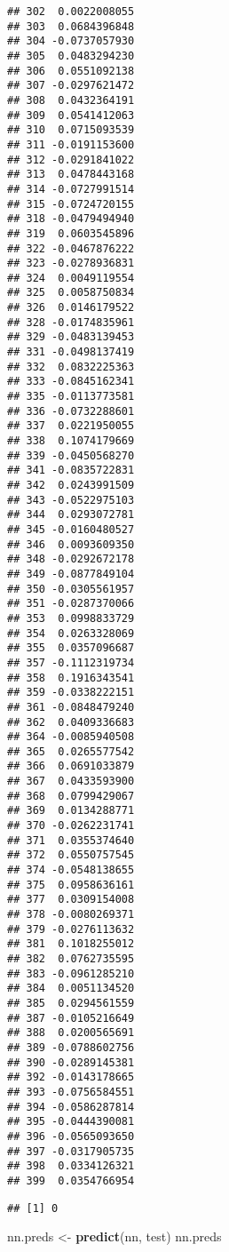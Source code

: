 \documentclass[
]{article}
\newenvironment{Shaded}{\begin{snugshade}}{\end{snugshade}}
\newcommand{\KeywordTok}[1]{\textcolor[rgb]{0.13,0.29,0.53}{\textbf{#1}}}
\newcommand{\NormalTok}[1]{#1}
\newcommand{\OperatorTok}[1]{\textcolor[rgb]{0.81,0.36,0.00}{\textbf{#1}}}
\newcommand{\StringTok}[1]{\textcolor[rgb]{0.31,0.60,0.02}{#1}}
\begin{document}
\begin{verbatim}
## 302  0.0022008055
## 303  0.0684396848
## 304 -0.0737057930
## 305  0.0483294230
## 306  0.0551092138
## 307 -0.0297621472
## 308  0.0432364191
## 309  0.0541412063
## 310  0.0715093539
## 311 -0.0191153600
## 312 -0.0291841022
## 313  0.0478443168
## 314 -0.0727991514
## 315 -0.0724720155
## 318 -0.0479494940
## 319  0.0603545896
## 322 -0.0467876222
## 323 -0.0278936831
## 324  0.0049119554
## 325  0.0058750834
## 326  0.0146179522
## 328 -0.0174835961
## 329 -0.0483139453
## 331 -0.0498137419
## 332  0.0832225363
## 333 -0.0845162341
## 335 -0.0113773581
## 336 -0.0732288601
## 337  0.0221950055
## 338  0.1074179669
## 339 -0.0450568270
## 341 -0.0835722831
## 342  0.0243991509
## 343 -0.0522975103
## 344  0.0293072781
## 345 -0.0160480527
## 346  0.0093609350
## 348 -0.0292672178
## 349 -0.0877849104
## 350 -0.0305561957
## 351 -0.0287370066
## 353  0.0998833729
## 354  0.0263328069
## 355  0.0357096687
## 357 -0.1112319734
## 358  0.1916343541
## 359 -0.0338222151
## 361 -0.0848479240
## 362  0.0409336683
## 364 -0.0085940508
## 365  0.0265577542
## 366  0.0691033879
## 367  0.0433593900
## 368  0.0799429067
## 369  0.0134288771
## 370 -0.0262231741
## 371  0.0355374640
## 372  0.0550757545
## 374 -0.0548138655
## 375  0.0958636161
## 377  0.0309154008
## 378 -0.0080269371
## 379 -0.0276113632
## 381  0.1018255012
## 382  0.0762735595
## 383 -0.0961285210
## 384  0.0051134520
## 385  0.0294561559
## 387 -0.0105216649
## 388  0.0200565691
## 389 -0.0788602756
## 390 -0.0289145381
## 392 -0.0143178665
## 393 -0.0756584551
## 394 -0.0586287814
## 395 -0.0444390081
## 396 -0.0565093650
## 397 -0.0317905735
## 398  0.0334126321
## 399  0.0354766954
\end{verbatim}

\begin{Shaded}
\end{Shaded}

\begin{verbatim}
## [1] 0
\end{verbatim}

\begin{Shaded}
\begin{Highlighting}[]
\NormalTok{nn.preds <-}\StringTok{ }\KeywordTok{predict}\NormalTok{(nn, test)}
\NormalTok{nn.preds}
\end{Highlighting}
\end{Shaded}
\end{document}
